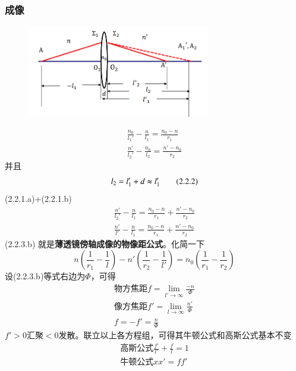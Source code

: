 \subsubsection{成像}        \begin{figure}[H]
            \centering
            \includegraphics[width=8cm]{img/1.7.png}
            \end{figure}
\begin{align}
    \frac{n_0}{l_1'}-\frac{n}{l_1}=\frac{n_0-n}{r_1} \tag{2.2.1.a}\\
    \frac{n'}{l_2'}-\frac{n_0}{l_2}=\frac{n'-n_0}{r_2} \tag{2.2.1.b}
\end{align}
并且
\begin{equation}
l_2=l_1'+d \thickapprox  l_1' \tag{2.2.2}
\end{equation}
(2.2.1.a)+(2.2.1.b)
\begin{align}
    \frac{n'}{l_2'}-\frac{n}{l_1}=\frac{n_0-n}{r_1}+\frac{n'-n_0}{r_2}\tag{2.2.3.a}\\
    \frac{n'}{l'}-\frac{n}{l_1}=\frac{n_0-n}{r_1}+\frac{n'-n_0}{r_2}\tag{2.2.3.b}
\end{align}
(2.2.3.b) 就是\textbf{薄透镜傍轴成像的物像距公式}。化简一下
\begin{equation}
    n(\frac{1}{r_1}-\frac{1}{l})-n'(\frac{1}{r_2}-\frac{1}{l'})=n_0(\frac{1}{r_1}-\frac{1}{r_2}) \tag{2.2.4}
\end{equation}
设(2.2.3.b)等式右边为$\Phi$，可得
\begin{align}
\text{物方焦距}f=\lim_{l' \to \infty}\frac{-n}{\Phi} \tag{2.2.5.a}\\
\text{像方焦距}f'=\lim_{l \to \infty}\frac{n'}{\Phi} \tag{2.2.5.b}\\
f=-f'=\frac{n}{\Phi} \tag{2.2.5.c}
\end{align}
$f'>0$汇聚$<0$发散。联立以上各方程组，可得其牛顿公式和高斯公式基本不变
\begin{align}
    \text{高斯公式}\frac{f'}{l'}+\frac{f}{l}=1 \tag{2.2.6.a}\\
    \text{牛顿公式}xx'=ff' \tag{2.2.6.b}
\end{align}

